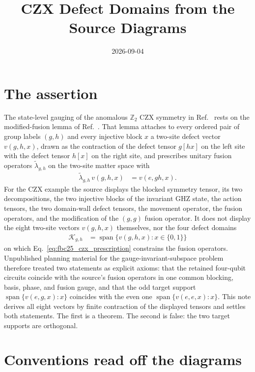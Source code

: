 \documentclass{article}
\title{CZX Defect Domains from the Source Diagrams}
\author{}
\date{2026-09-04}
\begin{document}
\maketitle
{}

\section{The assertion}

The state-level gauging of the anomalous $\mathbb Z_2$ CZX symmetry in
Ref.~\cite[lines~4503--5183]{FrancoRubio2025MPUGauging} rests on the
modified-fusion lemma of
Ref.~\cite[lines~4215--4254]{FrancoRubio2025MPUGauging}. That lemma attaches
to every ordered pair of group labels $(g,h)$ and every injective block $x$ a
two-site defect vector $v(g,h,x)$, drawn as the contraction of the defect
tensor $g[hx]$ on the left site with the defect tensor $h[x]$ on the right
site, and prescribes unitary fusion operators $\tilde\lambda_{g,h}$ on the
two-site matter space with
\begin{align}
    \tilde\lambda_{g,h}\,v(g,h,x)
        &=v(e,gh,x).
    \label{eq:fbc25_czx_prescription}
\end{align}
For the CZX example the source displays the blocked symmetry tensor, its two
decompositions, the two injective blocks of the invariant GHZ state, the
action tensors, the two domain-wall defect tensors, the movement operator,
the fusion operators, and the modification of the $(g,g)$ fusion operator.
It does not display the eight two-site vectors $v(g,h,x)$ themselves, nor
the four defect domains
\begin{align}
    \mathcal K_{g,h}
        &=\operatorname{span}\{v(g,h,x):x\in\{0,1\}\}
    \label{eq:fbc25_czx_domain_definition}
\end{align}
on which Eq.~\ref{eq:fbc25_czx_prescription} constrains the fusion
operators. Unpublished planning material for the gauge-invariant-subspace
problem therefore treated two statements as explicit axioms: that the
retained four-qubit circuits coincide with the source's fusion operators in
one common blocking, basis, phase, and fusion gauge, and that the odd target
support $\operatorname{span}\{v(e,g,x):x\}$ coincides with the even one
$\operatorname{span}\{v(e,e,x):x\}$. This note derives all eight vectors by
finite contraction of the displayed tensors and settles both statements.
The first is a theorem. The second is false: the two target supports are
orthogonal.

\section{Conventions read off the diagrams}
\end{document}
